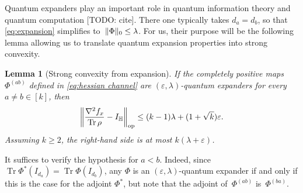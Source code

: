 \documentclass[aos]{imsart}
\newtheorem{lemma}[theorem]{Lemma}
\theoremstyle{definition}
\numberwithin{equation}{section}
\DeclareMathOperator{\op}{op}
\DeclareMathOperator{\tr}{Tr}
\DeclarePairedDelimiter{\norm}{\lVert}{\rVert}
\renewcommand{\H}{{\mathbb{H}}}
\newcommand{\eps}{\varepsilon}
\newcommand{\TODO}[1]{{\color{blue}[TODO: #1]}}
\begin{document}
Quantum expanders play an important role in quantum information theory and quantum computation \TODO{cite}.
There one typically takes $d_a=d_b$, so that \cref{eq:expansion} simplifies to~$\norm{\Phi}_0 \leq \lambda$.
For us, their purpose will be the following lemma allowing us to translate quantum expansion properties into strong convexity.

\begin{lemma}[Strong convexity from expansion]\label{lem:expansion-convexity}
If the completely positive maps $\Phi^{(ab)}$ defined in \cref{eq:hessian channel} are $(\eps,\lambda)$-quantum expanders for every $a\neq b\in[k]$, then
\begin{align*}
  \norm*{\frac{\nabla^2 f_x}{\tr \rho} - I_\H}_{\op}
\leq (k-1)\lambda + (1 + \sqrt k) \eps.
\end{align*}
Assuming $k\geq2$, the right-hand side is at most $k (\lambda + \eps)$.
\end{lemma}
\noindent
It suffices to verify the hypothesis for $a<b$.
Indeed, since $\tr \Phi^*(I_{d_a}) = \tr \Phi(I_{d_b})$, any $\Phi$ is an $(\eps,\lambda)$-quantum expander if and only if this is the case for the adjoint $\Phi^*$, but note that the adjoint of~$\Phi^{(ab)}$ is~$\Phi^{(ba)}$.
\end{document}
